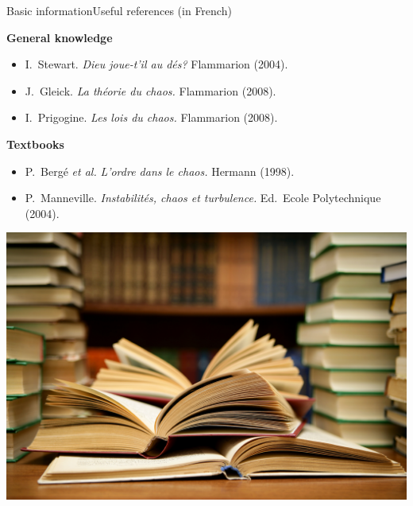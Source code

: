 \documentclass[usenames,dvipsnames,svgnames,10pt,aspectratio=169]{beamer}
\begin{document}
\begin{frame}[t, c]{Basic information}{Useful references (in French)}
	\begin{minipage}{.58\textwidth}
		\begin{block}{\centering \textbf{General knowledge}}
			\begin{itemize}
				\item I.\ Stewart. \emph{Dieu joue-t'il au dés?} Flammarion (2004).

				\medskip

				\item J.\ Gleick. \emph{La théorie du chaos.} Flammarion (2008).

				\medskip

				\item I.\ Prigogine. \emph{Les lois du chaos.} Flammarion (2008).
			\end{itemize}
		\end{block}%
		\vfill
		\begin{block}{\centering \textbf{Textbooks}}
			\begin{itemize}
				\item P.\ Bergé \emph{et al.} \emph{L'ordre dans le chaos.} Hermann (1998).

				\medskip

				\item P.\ Manneville. \emph{Instabilités, chaos et turbulence.} Ed.\ Ecole Polytechnique (2004).
			\end{itemize}
		\end{block}
	\end{minipage}%
	\hfill
	\begin{minipage}{.38\textwidth}
		\centering

		\includegraphics[width=\textwidth]{references}
	\end{minipage}

	\vspace{1cm}
\end{frame}
\end{document}
